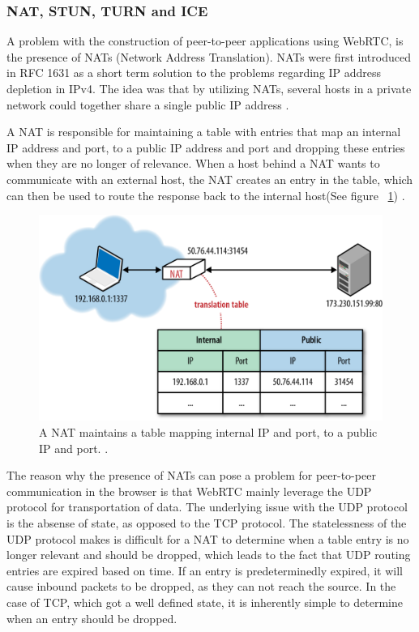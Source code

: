 \subsubsection{NAT, STUN, TURN and ICE}
A problem with the construction of peer-to-peer applications using WebRTC, is the presence of NATs (Network Address Translation). NATs were first introduced in RFC 1631 as a short term solution to the problems regarding IP address depletion in IPv4. The idea was that by utilizing NATs, several hosts in a private network could together share a single public IP address \cite{RFC1631:Online}.

A NAT is responsible for maintaining a table with entries that map an internal IP address and port, to a public IP address and port and dropping these entries when they are no longer of relevance. When a host behind a NAT wants to communicate with an external host, the NAT creates an entry in the table, which can then be used to route the response back to the internal host(See figure ~\ref{fig:NAT}) \cite{RFC5245:Online}.

\begin{figure}[htp]
\centering
\includegraphics[width=\textwidth,height=0.2\paperheight,keepaspectratio
]{figures/nat}
\caption{A NAT maintains a table mapping internal IP and port, to a public IP and port. \cite{NATIllustration:Online}.}
\label{fig:NAT}
\end{figure}

The reason why the presence of NATs can pose a problem for peer-to-peer communication in the browser is that WebRTC mainly leverage the UDP protocol for transportation of data. The underlying issue with the UDP protocol is the absense of state, as opposed to the TCP protocol. The statelessness of the UDP protocol makes is difficult for a NAT to determine when a table entry is no longer relevant and should be dropped, which leads to the fact that UDP routing entries are expired based on time. If an entry is predeterminedly expired, it will cause inbound packets to be dropped, as they can not reach the source. In the case of TCP, which got a well defined state, it is inherently simple to determine when an entry should be dropped.

